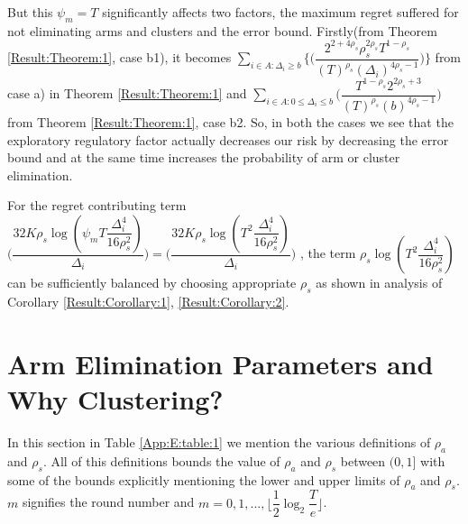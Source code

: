  But this $\psi_{m}=T$ significantly affects two factors, the maximum regret suffered for not eliminating arms and clusters and the error bound. Firstly(from Theorem \ref{Result:Theorem:1}, case b1), it becomes $ \sum_{i\in A:\Delta_{i}\geq b}\bigg\lbrace\bigg(\dfrac{2^{2+4\rho_{s}}\rho_{s}^{2\rho_{s}}T^{1-\rho_{s}}}{(T)^{\rho_{s}}(\Delta_{i})^{4\rho_{s}-1}}\bigg)\bigg\rbrace$ from case a) in Theorem \ref{Result:Theorem:1} and $\sum_{i\in A:0\leq \Delta_{i}\leq b} \bigg(\dfrac{T^{1-\rho_{s}}2^{2\rho_{s}+3}}{(T)^{\rho_{s}}(b)^{4\rho_{s} -1}} \bigg)$ from Theorem \ref{Result:Theorem:1}, case b2. So, in both the cases we see that the exploratory regulatory factor actually decreases our risk by decreasing the error bound and at the same time increases the probability of arm or cluster elimination.
	
 For the regret contributing term $\bigg(\dfrac{32K\rho_{s}\log{(\psi_{m}T\dfrac{\Delta_{i}^{4}}{16\rho_{s}^{2}})}}{\Delta_{i}}\bigg) = \bigg(\dfrac{32K\rho_{s}\log{(T^{2}\dfrac{\Delta_{i}^{4}}{16\rho_{s}^{2}})}}{\Delta_{i}}\bigg)$ , the term $\rho_{s}\log{(T^{2}\dfrac{\Delta_{i}^{4}}{16\rho_{s}^{2}})}$ can be sufficiently balanced by choosing appropriate $\rho_{s}$ as shown in analysis of Corollary \ref{Result:Corollary:1}, \ref{Result:Corollary:2}.

\section{Arm Elimination Parameters and Why Clustering?}
\label{App:E}
In this section in Table \ref{App:E:table:1} we mention the various definitions of $\rho_{a}$ and $\rho_{s}$. All of this definitions bounds the value of $\rho_{a}$ and $\rho_{s}$ between $(0,1]$ with some of the bounds explicitly mentioning the lower and upper limits of $\rho_{a}$ and $\rho_{s}$. $m$ signifies the round number and $m=0,1,...,\big \lfloor \dfrac{1}{2}\log_{2} \dfrac{T}{e}\big\rfloor$.

